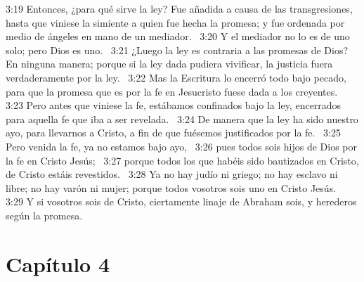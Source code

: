 3:19 Entonces, ¿para qué sirve la ley? Fue añadida a causa de las transgresiones, hasta que viniese la simiente a quien fue hecha la promesa; y fue ordenada por medio de ángeles en mano de un mediador.  
3:20 Y el mediador no lo es de uno solo; pero Dios es uno.  
3:21 ¿Luego la ley es contraria a las promesas de Dios? En ninguna manera; porque si la ley dada pudiera vivificar, la justicia fuera verdaderamente por la ley.  
3:22 Mas la Escritura lo encerró todo bajo pecado, para que la promesa que es por la fe en Jesucristo fuese dada a los creyentes.  
3:23 Pero antes que viniese la fe, estábamos confinados bajo la ley, encerrados para aquella fe que iba a ser revelada.  
3:24 De manera que la ley ha sido nuestro ayo, para llevarnos a Cristo, a fin de que fuésemos justificados por la fe.  
3:25 Pero venida la fe, ya no estamos bajo ayo,  
3:26 pues todos sois hijos de Dios por la fe en Cristo Jesús;  
3:27 porque todos los que habéis sido bautizados en Cristo, de Cristo estáis revestidos.  
3:28 Ya no hay judío ni griego; no hay esclavo ni libre; no hay varón ni mujer; porque todos vosotros sois uno en Cristo Jesús.  
3:29 Y si vosotros sois de Cristo, ciertamente linaje de Abraham sois, y herederos según la promesa. 
\section*{Capítulo 4} 


